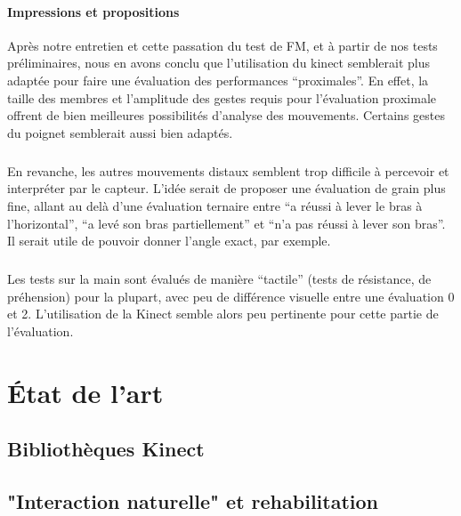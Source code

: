 \documentclass[french,12pt]{report}
\begin{document}
	\subsubsection{Impressions et propositions}
Après notre entretien et cette passation du test de FM, et à partir de nos tests préliminaires, nous en avons 
conclu que l'utilisation du kinect semblerait plus adaptée pour faire une évaluation des performances “proximales”.
En effet, la taille des membres et l'amplitude des gestes requis pour l'évaluation proximale offrent de bien 
meilleures possibilités d'analyse des mouvements. Certains gestes du poignet semblerait aussi bien adaptés.
\paragraph{}En revanche, les autres mouvements distaux semblent trop difficile à percevoir et interpréter par le capteur.
L’idée serait de proposer une évaluation de grain plus fine, allant au delà d’une évaluation ternaire entre 
“a réussi à lever le bras à l’horizontal”, “a levé son bras partiellement” et “n’a pas réussi à lever son bras”. 
Il serait utile de pouvoir donner l’angle exact, par exemple.   

\paragraph{}Les tests sur la main sont évalués de manière “tactile” (tests de résistance, de préhension) pour la plupart, 
avec peu de différence visuelle entre une évaluation 0 et 2. L’utilisation de la Kinect semble alors peu pertinente
pour cette partie de l’évaluation.
		
	\chapter{État de l'art}
	
  \section{Bibliothèques Kinect}
  
  
  \section{"Interaction naturelle" et rehabilitation}
  
	
	
\end{document}
